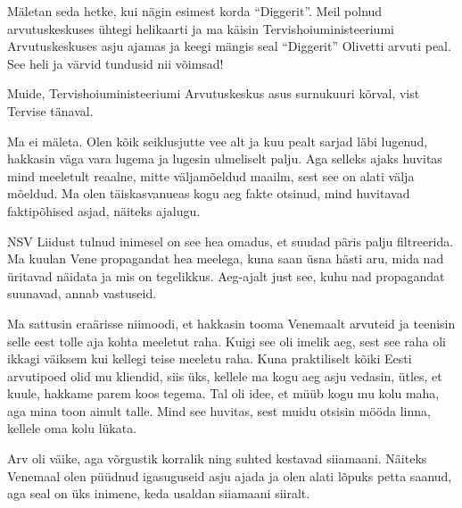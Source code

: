 Mäletan seda hetke, kui nägin esimest korda \enquote{Diggerit}. Meil polnud arvutuskeskuses ühtegi helikaarti ja ma käisin 
Tervishoiuministeeriumi Arvutuskeskuses asju ajamas ja 
keegi mängis seal \enquote{Diggerit} Olivetti arvuti peal. See heli ja värvid tundusid nii 
võimsad! 

Muide, Tervishoiuministeeriumi Arvutuskeskus asus 
surnukuuri kõrval, vist Tervise tänaval. 


Ma ei mäleta. Olen kõik seiklusjutte vee alt ja kuu pealt sarjad läbi 
lugenud, hakkasin väga vara lugema ja lugesin ulmeliselt palju. Aga 
selleks ajaks huvitas mind meeletult reaalne, mitte väljamõeldud maailm, sest see
on alati välja mõeldud. Ma olen täiskasvanueas kogu aeg fakte 
otsinud, mind huvitavad faktipõhised asjad, näiteks ajalugu. 


NSV Liidust tulnud inimesel on see hea omadus, et suudad päris palju 
filtreerida. Ma kuulan Vene propagandat hea meelega, kuna saan üsna hästi aru, mida nad üritavad näidata ja mis on 
tegelikkus. Aeg-ajalt just see, 
kuhu nad propagandat suunavad, annab vastuseid. 


Ma sattusin eraärisse niimoodi, et hakkasin tooma Venemaalt arvuteid ja 
teenisin selle eest tolle aja kohta meeletut raha. Kuigi see oli imelik aeg, sest
see raha oli ikkagi väiksem kui kellegi teise meeletu raha. Kuna 
praktiliselt kõiki Eesti arvutipoed olid mu kliendid, 
siis üks, kellele ma kogu aeg asju vedasin, ütles, et kuule, hakkame 
parem koos tegema. Tal oli
idee, et müüb kogu mu kolu maha, aga mina toon ainult talle. Mind see huvitas, sest muidu otsisin mööda linna, kellele oma 
kolu lükata. 


Arv oli väike, aga võrgustik korralik ning suhted kestavad 
siiamaani. Näiteks Venemaal olen püüdnud igasuguseid asju ajada ja olen alati 
lõpuks petta saanud, aga seal on üks inimene, keda usaldan siiamaani 
siiralt. 


